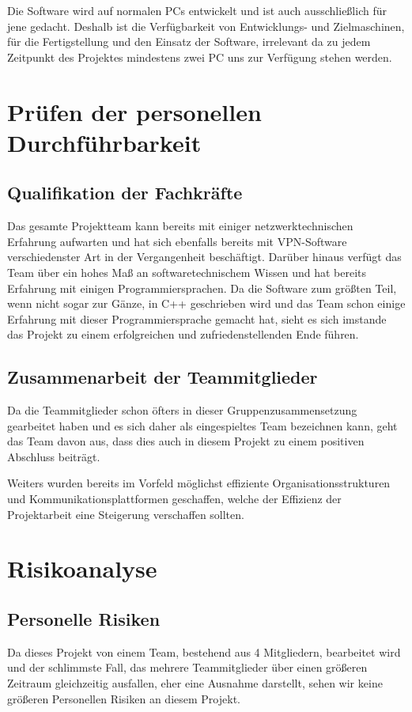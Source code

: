 \documentclass[a4paper,12pt]{scrreprt}
\begin{document}
	Die Software wird auf normalen PCs entwickelt und ist auch ausschließlich für jene gedacht. Deshalb ist die Verfügbarkeit von Entwicklungs- und Zielmaschinen, für die Fertigstellung und den Einsatz der Software, irrelevant da zu jedem Zeitpunkt des Projektes mindestens zwei PC uns zur Verfügung stehen werden.
			
	\section{Pr\"ufen der personellen Durchf\"uhrbarkeit}
		
		\subsection{Qualifikation der Fachkr\"afte}
			
		
	Das gesamte Projektteam kann bereits mit einiger netzwerktechnischen Erfahrung aufwarten und hat sich ebenfalls bereits mit VPN-Software verschiedenster Art in der Vergangenheit beschäftigt. Darüber hinaus verfügt das Team über ein hohes Maß an softwaretechnischem Wissen und hat bereits Erfahrung mit einigen Programmiersprachen. Da die Software zum größten Teil, wenn nicht sogar zur Gänze, in C++ geschrieben wird und das Team schon einige Erfahrung mit dieser Programmiersprache gemacht hat, sieht es sich imstande das Projekt zu einem erfolgreichen und zufriedenstellenden Ende führen.
	
		
		\subsection{Zusammenarbeit der Teammitglieder}
		
		
	Da die Teammitglieder schon öfters in dieser Gruppenzusammensetzung gearbeitet haben und es sich daher als eingespieltes Team bezeichnen kann, geht das Team davon aus, dass dies auch in diesem Projekt zu einem positiven Abschluss beiträgt.
	
	Weiters wurden bereits im Vorfeld möglichst effiziente Organisationsstrukturen und Kommunikationsplattformen geschaffen, welche der Effizienz der Projektarbeit eine Steigerung verschaffen sollten.
	
			
	\section{Risikoanalyse}
		
		\subsection{Personelle Risiken}
	Da dieses Projekt von einem Team, bestehend aus 4 Mitgliedern, bearbeitet wird und der schlimmste Fall, das mehrere Teammitglieder über einen größeren Zeitraum gleichzeitig ausfallen, eher eine  Ausnahme darstellt, sehen wir keine größeren Personellen Risiken an diesem Projekt.
	
\end{document}
